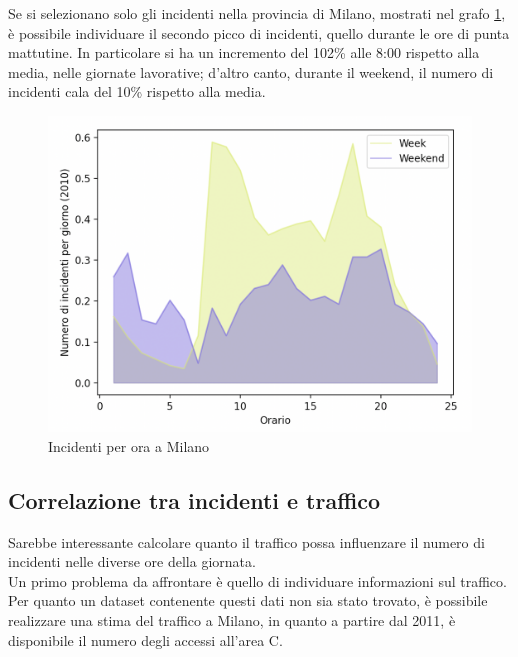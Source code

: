 \documentclass[a4paper]{report}
\begin{document}
Se si selezionano solo gli incidenti nella provincia di Milano, mostrati nel grafo 
\ref{fig:week-weekend-milano}, è possibile individuare 
il secondo picco di incidenti, quello durante le ore di punta mattutine.
In particolare si ha un incremento del 102\% alle 8:00 rispetto alla media, nelle giornate lavorative;
d'altro canto, durante il weekend, il numero di incidenti cala del 10\% rispetto alla media.


\begin{figure}
    \includegraphics[width=\linewidth]{../src/incidenti/incidenti_senza_coords/ore_punta/week_weekend_milano.png}
    \caption{Incidenti per ora a Milano}
    \label{fig:week-weekend-milano}
\end{figure}

\subsection{Correlazione tra incidenti e traffico}

Sarebbe interessante calcolare quanto il traffico possa influenzare il numero di incidenti 
nelle diverse ore della giornata. \\
Un primo problema da affrontare è quello di individuare informazioni sul traffico. 
Per quanto un dataset contenente questi dati non sia stato trovato, 
è possibile realizzare una stima del traffico a Milano, 
in quanto a partire dal 2011, è disponibile il numero degli accessi all'area C.
\end{document}
